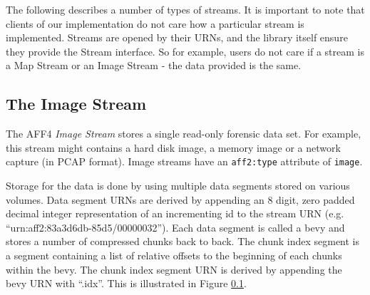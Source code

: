 \documentclass[10pt, conference]{IEEEtran}
\begin{document}
The following describes a number of types of streams. It is important
to note that clients of our implementation do not care how a
particular stream is implemented. Streams are opened by their URNs,
and the library itself ensure they provide the Stream interface. So
for example, users do not care if a stream is a Map Stream or an Image
Stream - the data provided is the same.




\subsection{The Image Stream}
\label{image_stream}
The AFF4 \emph{Image Stream} stores a single read-only forensic data
set. For example, this stream might contains a hard disk image, a
memory image or a network capture (in PCAP format). Image streams have
an \texttt{aff2:type} attribute of \texttt{image}.

Storage for the data is done by using multiple data segments stored on
various volumes. Data segment URNs are derived by appending an 8
digit, zero padded decimal integer representation of an incrementing
id to the stream URN (e.g. ``urn:aff2:83a3d6db-85d5/00000032''). Each
data segment is called a bevy and stores a number of compressed chunks
back to back. The chunk index segment is a segment containing a list
of relative offsets to the beginning of each chunks within the
bevy. The chunk index segment URN is derived  by appending the bevy
URN with ``.idx''. This is illustrated in Figure \ref{image_stream}.
\end{document}
